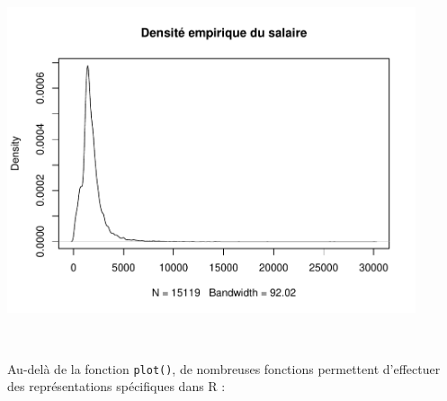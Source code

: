 \documentclass[12pt,twosided, notitlepage]{book}
\newenvironment{Shaded}{}{}
\newcommand{\CommentTok}[1]{\textcolor[rgb]{0.00,0.50,0.00}{#1}}
\newcommand{\DataTypeTok}[1]{#1}
\newcommand{\KeywordTok}[1]{\textcolor[rgb]{0.00,0.00,1.00}{#1}}
\newcommand{\NormalTok}[1]{#1}
\newcommand{\OperatorTok}[1]{#1}
\newcommand{\OtherTok}[1]{\textcolor[rgb]{1.00,0.25,0.00}{#1}}
\newcommand{\StringTok}[1]{\textcolor[rgb]{0.00,0.50,0.50}{#1}}
\renewenvironment{Shaded}{\begin{snugshade}}{\end{snugshade}}
\begin{document}
\begin{Shaded}
\end{Shaded}

\begin{center}\includegraphics[width=12cm]{livret_files/figure-latex/unnamed-chunk-441-2} \end{center}

~

Au-delà de la fonction \texttt{plot()}, de nombreuses fonctions
permettent d'effectuer des représentations spécifiques dans R :
\end{document}
